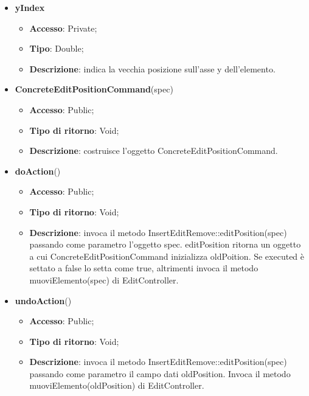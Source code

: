 {{{\begin{itemize}
\begin{itemize}
\begin{itemize}
\begin{itemize}
			\end{itemize}
			\item \textbf{yIndex}
			\begin{itemize}
				\item \textbf{Accesso}: Private;
				\item \textbf{Tipo}: Double;
				\item \textbf{Descrizione}: indica la vecchia posizione sull’asse y dell’elemento.
			\end{itemize}
		\end{itemize}
			\end{itemize}
			\end{itemize}
		\begin{itemize}
			\item \textbf{ConcreteEditPositionCommand}(spec)
			\begin{itemize}
				\item \textbf{Accesso}: Public;
				\item \textbf{Tipo di ritorno}: Void;
				\item \textbf{Descrizione}: costruisce l’oggetto ConcreteEditPositionCommand.
			\end{itemize}
			\item \textbf{doAction}()
			\begin{itemize}
				\item \textbf{Accesso}: Public;
				\item \textbf{Tipo di ritorno}: Void;
				\item \textbf{Descrizione}: invoca il metodo InsertEditRemove::editPosition(spec) passando come parametro l'oggetto spec. editPosition ritorna un oggetto a cui ConcreteEditPositionCommand inizializza oldPoition. Se executed è settato a false lo setta come true, altrimenti invoca il metodo muoviElemento(spec) di EditController.
			\end{itemize}
			\item \textbf{undoAction}()
			\begin{itemize}
				\item \textbf{Accesso}: Public;
				\item \textbf{Tipo di ritorno}: Void;
				\item \textbf{Descrizione}: invoca il metodo InsertEditRemove::editPosition(spec) passando come parametro il campo dati oldPosition. Invoca il metodo muoviElemento(oldPosition) di EditController.
			\end{itemize}
		\end{itemize}
		}
	
}}
